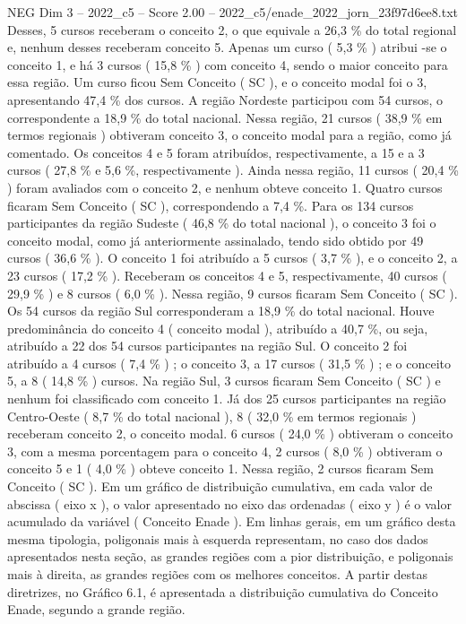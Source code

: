 \begin{textsample}{NEG Dim 3 – 2022\_c5 – Score 2.00 – 2022\_c5/enade\_2022\_jorn\_23f97d6ee8.txt}
Desses, 5 cursos receberam o conceito 2, o que equivale a 26,3 \% do total regional e, nenhum desses receberam conceito 5.
Apenas um curso ( 5,3 \% ) atribui -se o conceito 1, e há 3 cursos ( 15,8 \% ) com conceito 4, sendo o maior conceito para essa região.
Um curso ficou Sem Conceito ( SC ), e o conceito modal foi o 3, apresentando 47,4 \% dos cursos.
A região Nordeste participou com 54 cursos, o correspondente a 18,9 \% do total nacional.
Nessa região, 21 cursos ( 38,9 \% em termos regionais ) obtiveram conceito 3, o conceito modal para a região, como já comentado.
Os conceitos 4 e 5 foram atribuídos, respectivamente, a 15 e a 3 cursos ( 27,8 \% e 5,6 \%, respectivamente ).
Ainda nessa região, 11 cursos ( 20,4 \% ) foram avaliados com o conceito 2, e nenhum obteve conceito 1.
Quatro cursos ficaram Sem Conceito ( SC ), correspondendo a 7,4 \%.
Para os 134 cursos participantes da região Sudeste ( 46,8 \% do total nacional ), o conceito 3 foi o conceito modal, como já anteriormente assinalado, tendo sido obtido por 49 cursos ( 36,6 \% ).
O conceito 1 foi atribuído a 5 cursos ( 3,7 \% ), e o conceito 2, a 23 cursos ( 17,2 \% ).
Receberam os conceitos 4 e 5, respectivamente, 40 cursos ( 29,9 \% ) e 8 cursos ( 6,0 \% ).
Nessa região, 9 cursos ficaram Sem Conceito ( SC ).
Os 54 cursos da região Sul corresponderam a 18,9 \% do total nacional.
Houve predominância do conceito 4 ( conceito modal ), atribuído a 40,7 \%, ou seja, atribuído a 22 dos 54 cursos participantes na região Sul.
O conceito 2 foi atribuído a 4 cursos ( 7,4 \% ) ; o conceito 3, a 17 cursos ( 31,5 \% ) ; e o conceito 5, a 8 ( 14,8 \% ) cursos.
Na região Sul, 3 cursos ficaram Sem Conceito ( SC ) e nenhum foi classificado com conceito 1.
Já dos 25 cursos participantes na região Centro-Oeste ( 8,7 \% do total nacional ), 8 ( 32,0 \% em termos regionais ) receberam conceito 2, o conceito modal. 6 cursos ( 24,0 \% ) obtiveram o conceito 3, com a mesma porcentagem para o conceito 4, 2 cursos ( 8,0 \% ) obtiveram o conceito 5 e 1 ( 4,0 \% ) obteve conceito 1.
Nessa região, 2 cursos ficaram Sem Conceito ( SC ).
Em um gráfico de distribuição cumulativa, em cada valor de abscissa ( eixo x ), o valor apresentado no eixo das ordenadas ( eixo y ) é o valor acumulado da variável ( Conceito Enade ).
Em linhas gerais, em um gráfico desta mesma tipologia, poligonais mais à esquerda representam, no caso dos dados apresentados nesta seção, as grandes regiões com a pior distribuição, e poligonais mais à direita, as grandes regiões com os melhores conceitos.
A partir destas diretrizes, no Gráfico 6.1, é apresentada a distribuição cumulativa do Conceito Enade, segundo a grande região.

\end{textsample}
